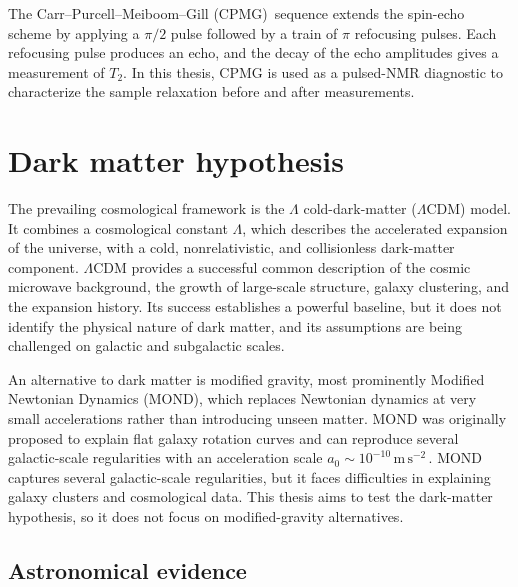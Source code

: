 The Carr--Purcell--Meiboom--Gill (CPMG)\,\cite{CarrPurcell1954_DiffusionFreePrecession, MeiboomGill1958_ModifiedSpinEcho} sequence extends the spin-echo scheme by applying a $\pi/2$ pulse followed by a train of $\pi$ refocusing pulses.
Each refocusing pulse produces an echo, and the decay of the echo amplitudes gives a measurement of $T_2$.
In this thesis, CPMG is used as a pulsed-NMR diagnostic to characterize the sample relaxation before and after measurements.


\section{Dark matter hypothesis}\label{sec:intro:DM}

The prevailing cosmological framework is the $\Lambda$ cold-dark-matter ($\Lambda$CDM) model.
It combines a cosmological constant $\Lambda$, which describes the accelerated expansion of the universe, with a cold, nonrelativistic, and collisionless dark-matter component.
$\Lambda$CDM provides a successful common description of the cosmic microwave background, the growth of large-scale structure, galaxy clustering, and the expansion history.
Its success establishes a powerful baseline, but it does not identify the physical nature of dark matter, and its assumptions are being challenged on galactic and subgalactic scales.

An alternative to dark matter is modified gravity, most prominently Modified Newtonian Dynamics (MOND), which replaces Newtonian dynamics at very small accelerations rather than introducing unseen matter.
MOND was originally proposed to explain flat galaxy rotation curves and can reproduce several galactic-scale regularities with an acceleration scale $a_0 \sim 10^{-10}\,\mathrm{m\,s^{-2}}$\,\cite{Milgrom1983_MOND,Banik2022_MONDreview,Zhao2005_MONDglobularClusters}.
MOND captures several galactic-scale regularities, but it faces difficulties in explaining galaxy clusters and cosmological data.
This thesis aims to test the dark-matter hypothesis, so it does not focus on modified-gravity alternatives.


\subsection{Astronomical evidence}

